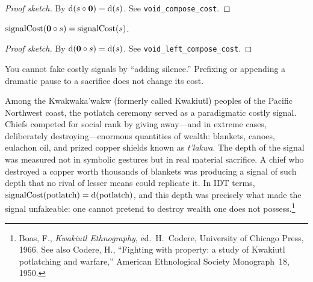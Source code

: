 \begin{proof}[Proof sketch]
By $\operatorname{d}(s \circ \mathbf{0}) = \operatorname{d}(s)$.
See \texttt{void\_compose\_cost}.
\end{proof}

\begin{theorem}
\label{thm:void-left-compose-cost}
$\operatorname{signalCost}(\mathbf{0} \circ s) = \operatorname{signalCost}(s)$.
\end{theorem}

\begin{proof}[Proof sketch]
By $\operatorname{d}(\mathbf{0} \circ s) = \operatorname{d}(s)$.
See \texttt{void\_left\_compose\_cost}.
\end{proof}

\begin{remark}
You cannot fake costly signals by ``adding silence.''  Prefixing or
appending a dramatic pause to a sacrifice does not change its cost.
\end{remark}

\begin{example}
Among the Kwakwaka'wakw (formerly called Kwakiutl) peoples of the
Pacific Northwest coast, the potlatch ceremony served as a paradigmatic
costly signal.  Chiefs competed for social rank by giving away---and in
extreme cases, deliberately destroying---enormous quantities of wealth:
blankets, canoes, eulachon oil, and prized copper shields known as
\textit{t'lakwa}.  The depth of the signal was measured not in symbolic
gestures but in real material sacrifice.  A chief who destroyed a copper
worth thousands of blankets was producing a signal of such depth that no
rival of lesser means could replicate it.  In IDT terms,
$\operatorname{signalCost}(\text{potlatch}) = \operatorname{d}(\text{potlatch})$,
and this depth was precisely what made the signal unfakeable: one cannot
pretend to destroy wealth one does not possess.\footnote{Boas, F.,
  \textit{Kwakiutl Ethnography}, ed.\ H.~Codere, University of Chicago
  Press, 1966.  See also Codere, H., ``Fighting with property: a study
  of Kwakiutl potlatching and warfare,'' American Ethnological Society
  Monograph~18, 1950.}
\end{example}

